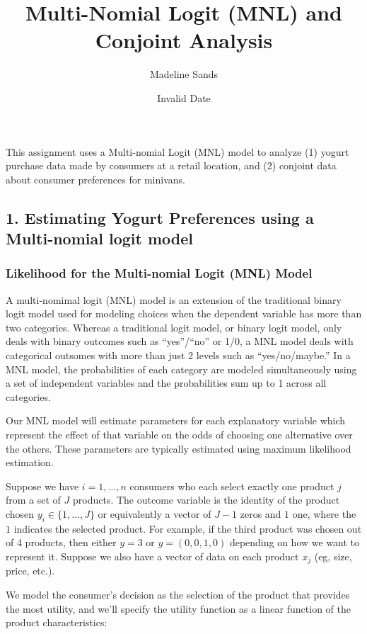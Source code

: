 \documentclass[
  letterpaper,
  DIV=11,
  numbers=noendperiod]{scrartcl}
\title{Multi-Nomial Logit (MNL) and Conjoint Analysis}
\author{Madeline Sands}
\date{Invalid Date}
\begin{document}
\maketitle

This assignment uses a Multi-nomial Logit (MNL) model to analyze (1)
yogurt purchase data made by consumers at a retail location, and (2)
conjoint data about consumer preferences for minivans.

\subsection{1. Estimating Yogurt Preferences using a Multi-nomial logit
model}\label{estimating-yogurt-preferences-using-a-multi-nomial-logit-model}

\subsubsection{Likelihood for the Multi-nomial Logit (MNL)
Model}\label{likelihood-for-the-multi-nomial-logit-mnl-model}

A multi-nomimal logit (MNL) model is an extension of the traditional
binary logit model used for modeling choices when the dependent variable
has more than two categories. Whereas a traditional logit model, or
binary logit model, only deals with binary outcomes such as
``yes''/``no'' or 1/0, a MNL model deals with categorical outsomes with
more than just 2 levels such as ``yes/no/maybe.'' In a MNL model, the
probabilities of each category are modeled simultaneously using a set of
independent variables and the probabilities sum up to 1 across all
categories.

Our MNL model will estimate parameters for each explanatory variable
which represent the effect of that variable on the odds of choosing one
alternative over the others. These parameters are typically estimated
using maximum likelihood estimation.

Suppose we have \(i=1,\ldots,n\) consumers who each select exactly one
product \(j\) from a set of \(J\) products. The outcome variable is the
identity of the product chosen \(y_i \in \{1, \ldots, J\}\) or
equivalently a vector of \(J-1\) zeros and \(1\) one, where the \(1\)
indicates the selected product. For example, if the third product was
chosen out of 4 products, then either \(y=3\) or \(y=(0,0,1,0)\)
depending on how we want to represent it. Suppose we also have a vector
of data on each product \(x_j\) (eg, size, price, etc.).

We model the consumer's decision as the selection of the product that
provides the most utility, and we'll specify the utility function as a
linear function of the product characteristics:
\end{document}
